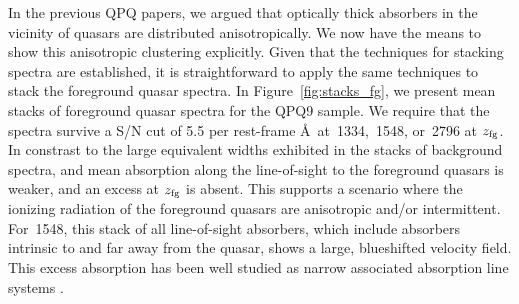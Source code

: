 \documentclass[iop]{emulateapj}
\begin{document}
In the previous QPQ papers, we argued that optically thick absorbers in the vicinity of quasars
are distributed anisotropically. We now have the means to show this anisotropic clustering
explicitly. Given that the techniques for stacking spectra are established, it is straightforward
to apply the same techniques to stack the foreground quasar spectra. In
Figure~\ref{fig:stacks_fg}, we present mean stacks of foreground quasar spectra for
the QPQ9 sample. We require that the spectra survive a S/N cut of 5.5 per rest-frame \AA\ at
\,1334, \,1548, or \,2796 at $z_{\rm fg}$. In constrast to the
large equivalent widths exhibited in the stacks of background spectra,  and 
mean absorption along the line-of-sight to the foreground quasars is weaker, and an excess at
$z_{\rm fg}$ is absent. This supports a scenario where the ionizing radiation of the foreground
quasars are anisotropic and/or intermittent. For \,1548, this stack of all line-of-sight
absorbers, which include absorbers intrinsic to and far away from the quasar, shows a large,
blueshifted velocity field. This excess  absorption has been well studied as narrow
associated absorption line systems \citep[e.g., ][]{Wild+08}.

%
%
\end{document}
